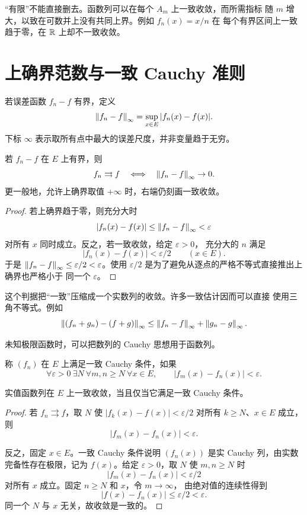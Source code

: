 “有限”不能直接删去。函数列可以在每个 \(A_m\) 上一致收敛，而所需指标
随 \(m\) 增大，以致在可数并上没有共同上界。例如 \(f_n(x)=x/n\) 在
每个有界区间上一致趋于零，在 \(\mathbb{R}\) 上却不一致收敛。

\section{上确界范数与一致 Cauchy 准则}

若误差函数 \(f_n-f\) 有界，定义
\[
 \left\lVert f_n-f\right\rVert_\infty
   =\sup_{x\in E}|f_n(x)-f(x)|.
\]
下标 \(\infty\) 表示取所有点中最大的误差尺度，并非变量趋于无穷。

\begin{theorem}[上确界判据]
若 \(f_n-f\) 在 \(E\) 上有界，则
\[
 f_n\rightrightarrows f\quad\Longleftrightarrow\quad
 \left\lVert f_n-f\right\rVert_\infty\to0.
\]
更一般地，允许上确界取值 \(+\infty\) 时，右端仍刻画一致收敛。
\end{theorem}

\begin{proof}
若上确界趋于零，则充分大时
\[
 |f_n(x)-f(x)|\le\left\lVert f_n-f\right\rVert_\infty<\varepsilon
\]
对所有 \(x\) 同时成立。反之，若一致收敛，给定 \(\varepsilon>0\)，
充分大的 \(n\) 满足
\[
 |f_n(x)-f(x)|<\varepsilon/2\qquad(x\in E).
\]
于是 \(\left\lVert f_n-f\right\rVert_\infty\le\varepsilon/2<\varepsilon\)。使用
\(\varepsilon/2\) 是为了避免从逐点的严格不等式直接推出上确界也严格小于
同一个 \(\varepsilon\)。
\end{proof}

这个判据把“一致”压缩成一个实数列的收敛。许多一致估计因而可以直接
使用三角不等式。例如
\[
 \left\lVert(f_n+g_n)-(f+g)\right\rVert_\infty
 \le\left\lVert f_n-f\right\rVert_\infty+\left\lVert g_n-g\right\rVert_\infty.
\]

未知极限函数时，可以把数列的 Cauchy 思想用于函数列。

\begin{definition}[一致 Cauchy 条件]
称 \((f_n)\) 在 \(E\) 上满足一致 Cauchy 条件，如果
\[
 \forall\varepsilon>0\ \exists N\ \forall m,n\ge N\ \forall x\in E,
 \qquad |f_m(x)-f_n(x)|<\varepsilon.
\]
\end{definition}

\begin{theorem}
实值函数列在 \(E\) 上一致收敛，当且仅当它满足一致 Cauchy 条件。
\label{thm:uniform-cauchy-criterion}
\end{theorem}

\begin{proof}
若 \(f_n\rightrightarrows f\)，取 \(N\) 使
\(|f_k(x)-f(x)|<\varepsilon/2\) 对所有 \(k\ge N\)、\(x\in E\)
成立，则
\[
 |f_m(x)-f_n(x)|<\varepsilon.
\]

反之，固定 \(x\in E\)。一致 Cauchy 条件说明 \((f_n(x))\) 是实
Cauchy 列，由实数完备性存在极限，记为 \(f(x)\)。给定
\(\varepsilon>0\)，取 \(N\) 使 \(m,n\ge N\) 时
\[
 |f_m(x)-f_n(x)|<\varepsilon/2
\]
对所有 \(x\) 成立。固定 \(n\ge N\) 和 \(x\)，令 \(m\to\infty\)，
由绝对值的连续性得到
\[
 |f(x)-f_n(x)|\le\varepsilon/2<\varepsilon.
\]
同一个 \(N\) 与 \(x\) 无关，故收敛是一致的。
\end{proof}

